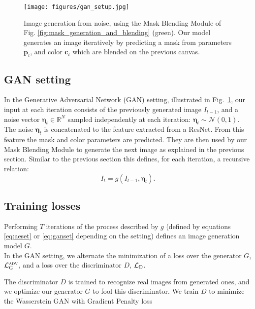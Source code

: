 \documentclass[10pt,twocolumn,letterpaper]{article}
\begin{document}
\begin{figure}[htb]
\centering
\texttt{[image: figures/gan\_setup.jpg]}
\caption{Image generation from noise, using the Mask Blending Module of Fig. \ref{fig:mask_generation_and_blending} (green). Our model generates an image iteratively by predicting a mask from parameters $\mathbf{p}_t$, and color $\mathbf{c}_t$ which are blended on the previous canvas.}
\label{fig:GAN_setup} 
\end{figure}

\subsection{GAN setting}

In the Generative Adversarial Network (GAN) setting, illustrated in Fig.~\ref{fig:GAN_setup}, our input at each iteration consists of the previously generated image $I_{t-1}$, and a noise vector $\mathbf{\eta}_t \in \mathbb{R}^N$ sampled independently at each iteration: $\mathbf{\eta}_t \sim \mathcal{N}(0,1)$.
{The noise $\mathbf{\eta}_t$ is concatenated to the feature extracted from a ResNet. From this feature the mask and color parameters are predicted. They are then used by our Mask Blending Module to generate the next image as explained in the previous section.} 
Similar to the previous section this defines, for each iteration, a recursive relation:
\begin{equation}
I_t = g(I_{t-1}, \mathbf{\eta}_t).
\label{eq:ganset}
\end{equation}


\subsection{Training losses}
Performing $T$ iterations of the process described by $g$ (defined by equations \ref{eq:aeset} or \ref{eq:ganset} depending on the setting) defines an image generation model $G$.\\

In the GAN setting, we alternate the minimization of a loss over the generator $G$, $\mathcal{L}^{\textsc{adv}}_\textsc{G}$, and a loss over the discriminator $D$, $\mathcal{L}_\textsc{D}$.     

The discriminator $D$ is trained to recognize real images from generated ones, and we optimize our generator $G$ to fool this discriminator. We train $D$ to minimize the Wasserstein GAN with Gradient Penalty loss~\cite{gulrajani2017improved}
\end{document}
